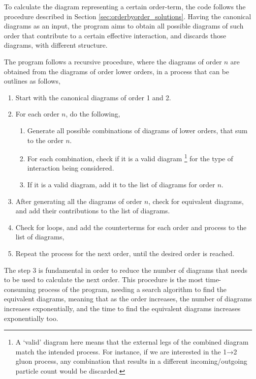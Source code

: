 \documentclass[11pt,a4paper,twoside,pdf]{article}
\numberwithin{equation}{section}
\begin{document}
To calculate the diagram representing a certain order-term, the code follows the 
procedure described in Section \ref{sec:orderbyorder_solutions}. Having the
canonical diagrams as an input, the program aims to obtain all possible diagrams of such order
that contribute to a certain effective interaction, and discards those diagrams, with
different structure.

The program follows a recursive procedure, where the diagrams of order $n$ are
obtained from the diagrams of order lower orders, in a process that can be outlines
as follows,

\begin{enumerate}
    \item Start with the canonical diagrams of order 1 and 2.
    \item For each order $n$, do the following,
    \begin{enumerate}
        \item Generate all possible combinations of diagrams of lower orders, that 
        sum to the order $n$.
        \item For each combination, check if it is a valid diagram \footnote{A ‘valid’ diagram here means that the external legs of the combined diagram match the intended process. For instance, if we are interested in the 1→2 gluon process, any combination that results in a different incoming/outgoing particle count would be discarded.} 
        for the type of interaction
        being considered.
        \item If it is a valid diagram, add it to the list of diagrams for order $n$.
    \end{enumerate}
    \item After generating all the diagrams of order $n$, check for equivalent diagrams,
    and add their contributions to the list of diagrams.
    \item Check for loops, and add the counterterms for each order and process
    to the list of diagrams,
    \item Repeat the process for the next order, until the desired order is reached.
\end{enumerate}

The step 3 is fundamental in order to reduce the number of diagrams that needs to 
be used to calculate the next order. This procedure is the most time-consuming process 
of the program, needing a search algorithm to find the equivalent diagrams, meaning 
that as the order increases, the number of diagrams increases exponentially, and the 
time to find the equivalent diagrams increases exponentially too. 
\end{document}
